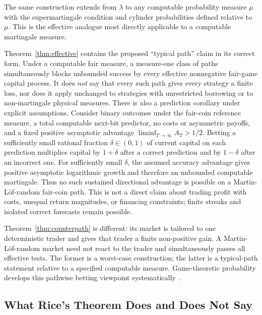 \documentclass[aps,pra,reprint,superscriptaddress,amsmath,amssymb,floatfix]{revtex4-2}
\theoremstyle{plain}
\theoremstyle{definition}
\theoremstyle{remark}
\begin{document}
The same construction extends from \(\lambda\) to any computable probability
measure \(\mu\) with the supermartingale condition and cylinder probabilities
defined relative to \(\mu\). This is the effective analogue most directly
applicable to a computable martingale measure.

Theorem~\ref{thm:effective} contains the proposed ``typical path'' claim in its
correct form. Under a computable fair measure, a measure-one class of paths
simultaneously blocks unbounded success by every effective nonnegative
fair-game capital process. It does \emph{not} say that every such path gives
every strategy a finite loss, nor does it apply unchanged to strategies with
unrestricted borrowing or to non-martingale physical measures.
There is also a prediction corollary under explicit assumptions. Consider
binary outcomes under the fair-coin reference measure, a total computable
next-bit predictor, no costs or asymmetric payoffs, and a fixed positive
asymptotic advantage \(\liminf_{T\to\infty}A_T>1/2\). Betting a sufficiently
small rational fraction \(\delta\in(0,1)\) of current capital on each
prediction multiplies capital by \(1+\delta\) after a correct prediction and
by \(1-\delta\) after an incorrect one. For sufficiently small \(\delta\), the
assumed accuracy advantage gives positive asymptotic logarithmic growth and
therefore an unbounded computable martingale. Thus no such sustained
directional advantage is possible on a Martin-L\"of-random fair-coin path.
This is not a direct claim about trading profit with costs, unequal return
magnitudes, or financing constraints; finite streaks and isolated correct
forecasts remain possible.

Theorem~\ref{thm:counterpath} is different: its market is tailored to one
deterministic trader and gives that trader a finite non-positive gain. A
Martin-L\"of-random market need not react to the trader and simultaneously
passes all effective tests. The former is a worst-case construction; the
latter is a typical-path statement relative to a specified computable
measure. Game-theoretic probability develops this pathwise betting viewpoint
systematically~\cite{ShaferVovk2001}.

\subsection{What Rice's Theorem Does and Does Not Say}
\end{document}
